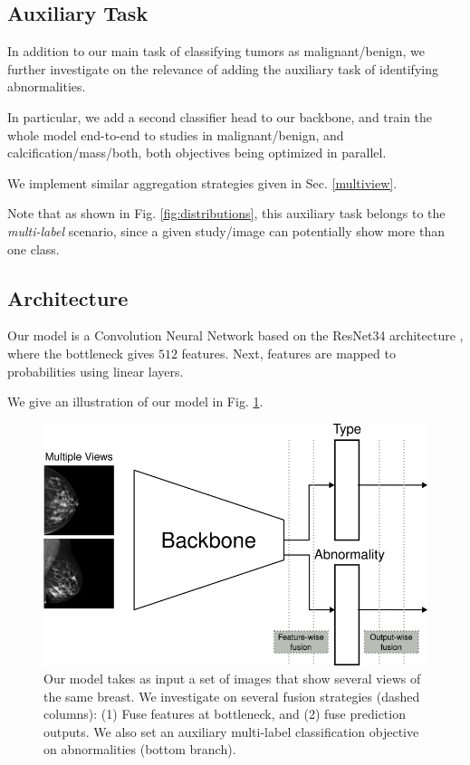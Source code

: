 \documentclass[11pt]{article}
\begin{document}
\subsection{Auxiliary Task}
\label{sec:orgd3f5cb1}

In addition to our main task of classifying tumors as malignant/benign, we
further investigate on the relevance of adding the auxiliary task of identifying
abnormalities.

In particular, we add a second classifier head to our backbone, and train the whole
model end-to-end to studies in malignant/benign, and calcification/mass/both,
both objectives being optimized in parallel.

We implement similar aggregation strategies given in Sec. \ref{multiview}.

Note that as shown in Fig. \ref{fig:distributions}, this auxiliary task belongs to the
\emph{multi-label} scenario, since a given study/image can potentially
show more than one class.

\subsection{Architecture}
\label{sec:org17f241f}

Our model is a Convolution Neural Network based on the ResNet34
architecture \autocite{he15}, where the bottleneck gives \(512\) features.
Next, features are mapped to probabilities using linear layers.

We give an illustration of our model in Fig. \ref{fig:model}.

\begin{figure}[htbp]
\centering
\includegraphics[width=.9\linewidth]{./images/model.png}
\caption{\label{fig:model}Our model takes as input a set of images that show several views of the same breast. We investigate on several fusion strategies (dashed columns): (1) Fuse features at bottleneck, and (2) fuse prediction outputs. We also set an auxiliary multi-label classification objective on abnormalities (bottom branch).}
\end{figure}
\end{document}
